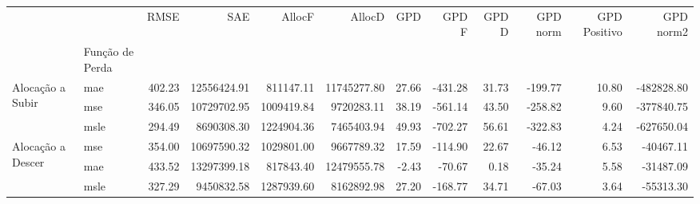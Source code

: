 \begin{tabular}{llrrrrrrrrrr}
\toprule
 &  & RMSE & SAE & AllocF & AllocD & GPD & GPD F & GPD D & GPD norm & GPD Positivo & GPD norm2 \\
 & Função de Perda &  &  &  &  &  &  &  &  &  &  \\
\midrule
\multirow[t]{3}{*}{Alocação a Subir} & mae & 402.23 & 12556424.91 & 811147.11 & 11745277.80 & 27.66 & -431.28 & 31.73 & -199.77 & 10.80 & -482828.80 \\
 & mse & 346.05 & 10729702.95 & 1009419.84 & 9720283.11 & 38.19 & -561.14 & 43.50 & -258.82 & 9.60 & -377840.75 \\
 & msle & 294.49 & 8690308.30 & 1224904.36 & 7465403.94 & 49.93 & -702.27 & 56.61 & -322.83 & 4.24 & -627650.04 \\
\cline{1-12}
\multirow[t]{3}{*}{Alocação a Descer} & mse & 354.00 & 10697590.32 & 1029801.00 & 9667789.32 & 17.59 & -114.90 & 22.67 & -46.12 & 6.53 & -40467.11 \\
 & mae & 433.52 & 13297399.18 & 817843.40 & 12479555.78 & -2.43 & -70.67 & 0.18 & -35.24 & 5.58 & -31487.09 \\
 & msle & 327.29 & 9450832.58 & 1287939.60 & 8162892.98 & 27.20 & -168.77 & 34.71 & -67.03 & 3.64 & -55313.30 \\
\cline{1-12}
\bottomrule
\end{tabular}
